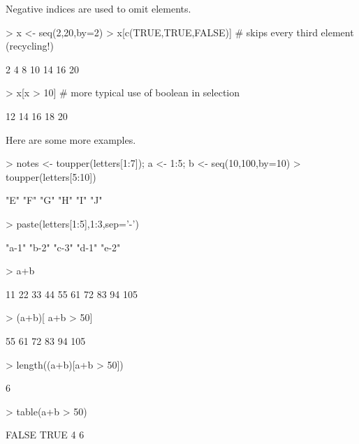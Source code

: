 \noindent
Negative indices are used to omit elements.

\begin{Schunk}
\begin{Sinput}
> x <- seq(2,20,by=2)
> x[c(TRUE,TRUE,FALSE)]        # skips every third element (recycling!)
\end{Sinput}
\begin{Soutput}
[1]  2  4  8 10 14 16 20
\end{Soutput}
\begin{Sinput}
> x[x > 10]                    # more typical use of boolean in selection
\end{Sinput}
\begin{Soutput}
[1] 12 14 16 18 20
\end{Soutput}
\end{Schunk}

\noindent
Here are some more examples.
%
%

\begin{Schunk}
\begin{Sinput}
> notes <- toupper(letters[1:7]); a <- 1:5; b <- seq(10,100,by=10)
> toupper(letters[5:10])                
\end{Sinput}
\begin{Soutput}
[1] "E" "F" "G" "H" "I" "J"
\end{Soutput}
\begin{Sinput}
> paste(letters[1:5],1:3,sep='-')
\end{Sinput}
\begin{Soutput}
[1] "a-1" "b-2" "c-3" "d-1" "e-2"
\end{Soutput}
\begin{Sinput}
> a+b
\end{Sinput}
\begin{Soutput}
 [1]  11  22  33  44  55  61  72  83  94 105
\end{Soutput}
\begin{Sinput}
> (a+b)[ a+b > 50]
\end{Sinput}
\begin{Soutput}
[1]  55  61  72  83  94 105
\end{Soutput}
\begin{Sinput}
> length((a+b)[a+b > 50])
\end{Sinput}
\begin{Soutput}
[1] 6
\end{Soutput}
\begin{Sinput}
> table(a+b > 50)
\end{Sinput}
\begin{Soutput}
FALSE  TRUE 
    4     6 
\end{Soutput}
\end{Schunk}

